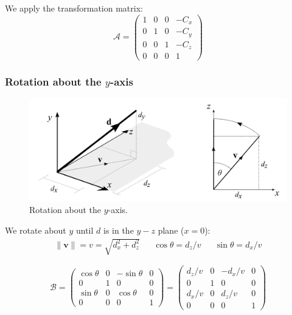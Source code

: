 \documentclass[11pt]{article}
\begin{document}
We apply the transformation matrix:
\[
  \mathcal{A} =
  \begin{pmatrix}
    1 & 0 & 0 & -C_x \\
    0 & 1 & 0 & -C_y \\
    0 & 0 & 1 & -C_z \\
    0 & 0 & 0 & 1
  \end{pmatrix}
\]

\subsubsection{Rotation about the $y$-axis}
\begin{figure}[h]
  \caption{Rotation about the $y$-axis.}
  \includegraphics[scale=0.2]{roty}
  \centering
\end{figure}

We rotate about $y$ until $d$ is in the $y-z$ plane ($x = 0$):
\begin{align*}
  \lVert \textbf{v} \lVert = v = \sqrt{d_x^2 + d_z^2} && \cos \theta = d_z / v && \sin \theta = d_x / v
\end{align*}

\[
  \mathcal{B} =
  \begin{pmatrix}
    \cos \theta & 0 & -\sin \theta & 0 \\
    0 & 1 & 0 & 0 \\
    \sin \theta & 0 & \cos \theta & 0 \\
    0 & 0 & 0 & 1
  \end{pmatrix}
  =
  \begin{pmatrix}
    d_z / v & 0 & -d_x / v & 0 \\
    0 & 1 & 0 & 0 \\
    d_x / v & 0 & d_z / v & 0 \\
    0 & 0 & 0 & 1
  \end{pmatrix}
\]
\end{document}

